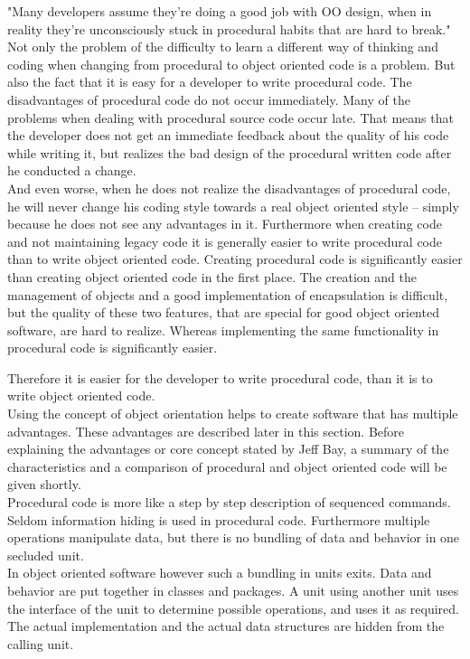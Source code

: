 "Many developers assume they’re doing a good job with OO design, when in reality they’re unconsciously
stuck in procedural habits that are hard to break." \cite[p. 70]{bay2008} Not only the problem of the difficulty to learn a different way of thinking and coding when changing from procedural to object oriented code is a problem. But also the fact that it is easy for a developer to write procedural code. The disadvantages of procedural code do not occur immediately. Many of the problems when dealing with procedural source code occur late. That means that the developer does not get an immediate feedback about the quality of his code while writing it, but realizes the bad design of the procedural written code after he conducted a change. 
\\

And even worse, when he does not realize the disadvantages of procedural code, he will never change his coding style towards a real object oriented style -- simply because he does not see any advantages in it. Furthermore when creating code and not maintaining legacy code it is generally easier to write procedural code than to write object oriented code. Creating procedural code is significantly easier than creating object oriented code in the first place. The creation and the management of objects and a good implementation of encapsulation is difficult, but the quality of these two features, that are special for good object oriented software, are hard to realize. Whereas implementing the same functionality in procedural code is significantly easier.

Therefore it is easier for the developer to write procedural code, than it is to write object oriented code. 
\\

Using the concept of object orientation helps to create software that has multiple advantages. These advantages are described later in this section. Before explaining the advantages or core concept stated by Jeff Bay, a summary of the characteristics and a comparison of procedural and object oriented code will be given shortly. 
\\

Procedural code is more like a step by step description of sequenced commands. 	Seldom information hiding is used in procedural code. Furthermore multiple operations manipulate data, but there is no bundling of data and behavior in one secluded unit. 
\\

In object oriented software however such a bundling in units exits. Data and behavior are put together in classes and packages. A unit using another unit uses the interface of the unit to determine possible operations, and uses it as required. The actual implementation and the actual data structures are hidden from the calling unit.
\\
 
